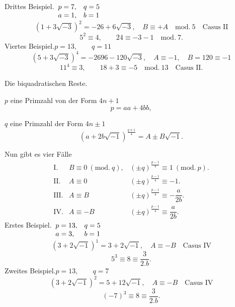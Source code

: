 \noindent{}\hspace*{\parindent}Drittes Beispiel.\qquad $\begin{array}[t]{ll}p=7,&q=5\\a=1,&b=1\end{array}$
\[(1+3\sqrt{-3})^2=-26+6\sqrt{-3},\quad B\equiv+A\quad\mathrm{mod.}\ 5\quad\text{Casus II}\]
\[5^2\equiv4,\qquad24\equiv-3-1\quad\mathrm{mod.}\ 7.\]
\noindent\hspace*{\parindent}Viertes Beispiel.\qquad $p=13,\qquad q=11$
\[(5+3\sqrt{-3})^4=-2696-120\sqrt{-3},\quad A\equiv-1,\quad B=120\equiv-1\]
\[11^4\equiv3,\qquad18+3\equiv-5\quad\mathrm{mod.}\ 13\quad\text{Casus II.}\]
\begin{center}Die biquadratischen Reste.\end{center}
\noindent\hspace*{\parindent}$p$ eine Primzahl von der Form $4n+1$
\[p=aa+4bb,\]
\par\noindent\hspace*{\parindent}$q$ eine Primzahl der Form $4n\pm1$
\[(a+2b\sqrt{-1})^{\frac{q\mp1}{4}}=A\pm B\sqrt{-1}.\]
\par\noindent\hspace*{\parindent}Nun gibt es vier Fälle
\[\begin{array}{rll}
\text{I.}&B\equiv0\ (\mathrm{mod.}\ q),&(\pm q)^{\frac{p-1}{4}}\equiv1\ (\mathrm{mod.}\ p).\\[4pt]
\text{II.}&A\equiv0&(\pm q)^{\frac{p-1}{4}}\equiv-1.\\[4pt]
\text{III.}&A\equiv B&(\pm q)^{\frac{p-1}{4}}\equiv-\dfrac{a}{2b}.\\[8pt]
\text{IV.}&A\equiv-B&(\pm q)^{\frac{p-1}{4}}\equiv\dfrac{a}{2b}.
\end{array}\]
\noindent\hspace*{\parindent}Erstes Beispiel.\qquad $\begin{array}[t]{ll}p=13,&q=5\\a=3,&b=1\end{array}$
\[(3+2\sqrt{-1})^1=3+2\sqrt{-1},\quad A\equiv-B\quad\text{Casus IV}\]
\[5^3\equiv8\equiv\dfrac{3}{2.b}.\]
\noindent\hspace*{\parindent}Zweites Beispiel.\qquad $p=13,\qquad q=7$
\[(3+2\sqrt{-1})^2=5+12\sqrt{-1},\quad A\equiv-B\quad\text{Casus IV}\]
\[(-7)^3\equiv8\equiv\dfrac{3}{2.b}.\]
